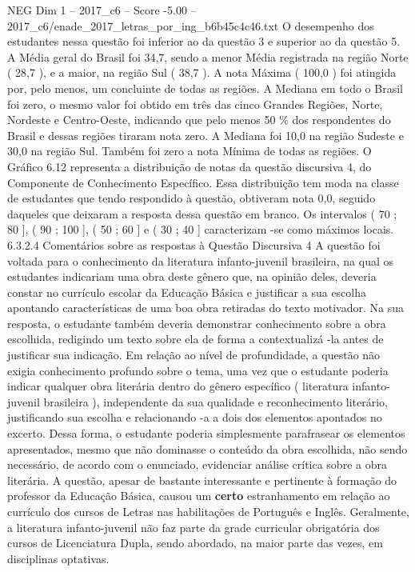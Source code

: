 \begin{textsample}{NEG Dim 1 – 2017\_c6 – Score -5.00 – 2017\_c6/enade\_2017\_letras\_por\_ing\_b6b45c4c46.txt}
O desempenho dos estudantes nessa questão foi inferior ao da questão 3 e superior ao da questão 5.
A Média geral do Brasil foi 34,7, sendo a menor Média registrada na região Norte ( 28,7 ), e a maior, na região Sul ( 38,7 ).
A nota Máxima ( 100,0 ) foi atingida por, pelo menos, um concluinte de todas as regiões.
A Mediana em todo o Brasil foi zero, o mesmo valor foi obtido em três das cinco Grandes Regiões, Norte, Nordeste e Centro-Oeste, indicando que pelo menos 50 \% dos respondentes do Brasil e dessas regiões tiraram nota zero.
A Mediana foi 10,0 na região Sudeste e 30,0 na região Sul.
Também foi zero a nota Mínima de todas as regiões.
O Gráfico 6.12 representa a distribuição de notas da questão discursiva 4, do Componente de Conhecimento Específico.
Essa distribuição tem moda na classe de estudantes que tendo respondido à questão, obtiveram nota 0,0, seguido daqueles que deixaram a resposta dessa questão em branco.
Os intervalos ( 70 ; 80 ], ( 90 ; 100 ], ( 50 ; 60 ] e ( 30 ; 40 ] caracterizam -se como máximos locais. 6.3.2.4 Comentários sobre as respostas à Questão Discursiva 4 A questão foi voltada para o conhecimento da literatura infanto-juvenil brasileira, na qual os estudantes indicariam uma obra deste gênero que, na opinião deles, deveria constar no currículo escolar da Educação Básica e justificar a sua escolha apontando características de uma boa obra retiradas do texto motivador.
Na sua resposta, o estudante também deveria demonstrar conhecimento sobre a obra escolhida, redigindo um texto sobre ela de forma a contextualizá -la antes de justificar sua indicação.
Em relação ao nível de profundidade, a questão não exigia conhecimento profundo sobre o tema, uma vez que o estudante poderia indicar qualquer obra literária dentro do gênero específico ( literatura infanto-juvenil brasileira ), independente da sua qualidade e reconhecimento literário, justificando sua escolha e relacionando -a a dois dos elementos apontados no excerto.
Dessa forma, o estudante poderia simplesmente parafrasear os elementos apresentados, mesmo que não dominasse o conteúdo da obra escolhida, não sendo necessário, de acordo com o enunciado, evidenciar análise crítica sobre a obra literária.
A questão, apesar de bastante interessante e pertinente à formação do professor da Educação Básica, causou um \textbf{certo} estranhamento em relação ao currículo dos cursos de Letras nas habilitações de Português e Inglês.
Geralmente, a literatura infanto-juvenil não faz parte da grade curricular obrigatória dos cursos de Licenciatura Dupla, sendo abordado, na maior parte das vezes, em disciplinas optativas.

\end{textsample}
